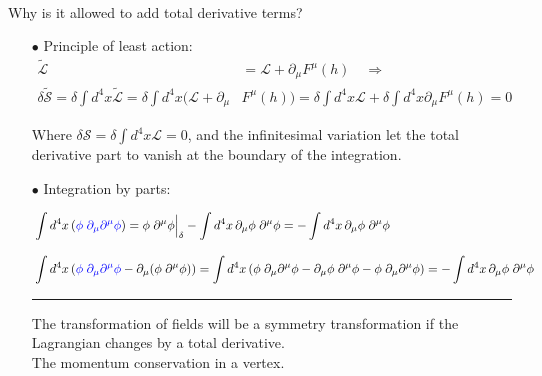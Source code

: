 \documentclass[aspectratio=169,usenames,dvipsnames]{beamer}
\begin{document}
\begin{frame}{\centering {}\\ Why is it allowed to add total derivative terms?} \small
{}
\begin{itemize}
  \item[$\bullet$] Principle of least action: \scriptsize
  \begin{align*}
    \tilde{\mathcal{L}} & = \mathcal{L} + \partial_{\mu} F^{\mu} (h) \quad \Rightarrow \\[3mm]
    \delta \mathcal{\tilde{S}} = \delta \int d^4x \tilde{\mathcal{L}} = \delta \int d^4x \big( \mathcal{L} + \partial_{\mu} & F^{\mu} (h) \big ) = \delta \int d^4x \mathcal{L} + \delta \int d^4x \partial_{\mu} F^{\mu} (h) = 0
  \end{align*}

\scriptsize{Where \(\delta \mathcal{S} =\delta \int d^4x \mathcal{L} = 0\), and the infinitesimal variation let the total derivative part to vanish at the boundary of the integration.} \\[4mm]

\small\item[$\bullet$] Integration by parts: \\[1mm] \scriptsize

\begin{align*}
&  \int d^4x\, ({\color{blue}\phi\; \partial_{\mu}\partial^{\mu}\phi} ) = \phi
  \; \partial^{\mu}\phi \Big\rvert_{\delta} - \int d^4 x\, \partial_{\mu}\phi\;
  \partial^{\mu}\phi =   - \int d^4 x\, \partial_{\mu}\phi\; \partial^{\mu}\phi  \\[3mm]
& \int d^4 x\, ({\color{blue}\phi\; \partial_{\mu}\partial^{\mu}\phi} - \partial_{\mu} (\phi\;\partial^{\mu}\phi)) = \int d^4 x\, (\phi\;\partial_{\mu}\partial^{\mu}\phi - \partial_{\mu}\phi\; \partial^{\mu}\phi - \phi\;
 \partial_{\mu}\partial^{\mu}\phi) = - \int d^4 x\, \partial_{\mu}\phi\; \partial^{\mu}\phi    
\end{align*}
\vspace{1mm}
\textcolor{LUCopper}{\rule{\textwidth}{1pt}}
\tiny{The transformation of fields will be a symmetry transformation if the
  Lagrangian changes by a total derivative.\\ }
\tiny{The momentum conservation in a vertex.}
\end{itemize}
\vspace{30mm}
\end{frame}
\end{document}
